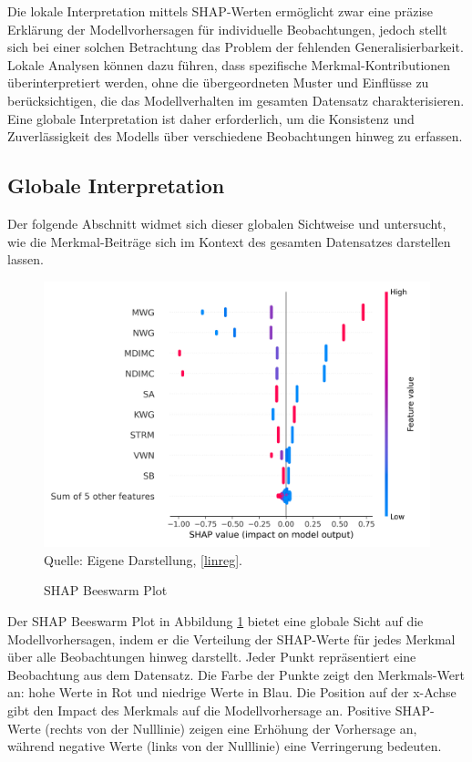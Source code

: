 Die lokale Interpretation mittels SHAP-Werten ermöglicht zwar eine präzise Erklärung 
der Modellvorhersagen für individuelle Beobachtungen, jedoch stellt sich bei einer 
solchen Betrachtung das Problem der fehlenden Generalisierbarkeit. 
Lokale Analysen können dazu führen, dass spezifische Merkmal-Kontributionen überinterpretiert werden, 
ohne die übergeordneten Muster und Einflüsse zu berücksichtigen, 
die das Modellverhalten im gesamten Datensatz charakterisieren. 
Eine globale Interpretation ist daher erforderlich, um die Konsistenz und Zuverlässigkeit 
des Modells über verschiedene Beobachtungen hinweg zu erfassen. 

\subsection{Globale Interpretation}

Der folgende Abschnitt widmet sich dieser globalen Sichtweise und untersucht, 
wie die Merkmal-Beiträge sich im Kontext des gesamten Datensatzes darstellen lassen.

\begin{figure}[!h]
    \caption{SHAP Beeswarm Plot}
    \includegraphics[width=1\textwidth]{../scripts/images/shap_beeswarm_plot_gpu.png}
    Quelle: Eigene Darstellung, \ref{linreg}.
    \label{pic:shap_beeswarm}
\end{figure}

Der SHAP Beeswarm Plot in Abbildung \ref{pic:shap_beeswarm} bietet eine globale 
Sicht auf die Modellvorhersagen, indem er die Verteilung der SHAP-Werte für jedes Merkmal 
über alle Beobachtungen hinweg darstellt. Jeder Punkt repräsentiert eine Beobachtung aus dem Datensatz.
Die Farbe der Punkte zeigt den Merkmals-Wert an: hohe Werte in Rot und niedrige Werte in Blau. 
Die Position auf der x-Achse gibt den Impact des Merkmals auf die Modellvorhersage an. 
Positive SHAP-Werte (rechts von der Nulllinie) zeigen eine Erhöhung der Vorhersage an, 
während negative Werte (links von der Nulllinie) eine Verringerung bedeuten. 

